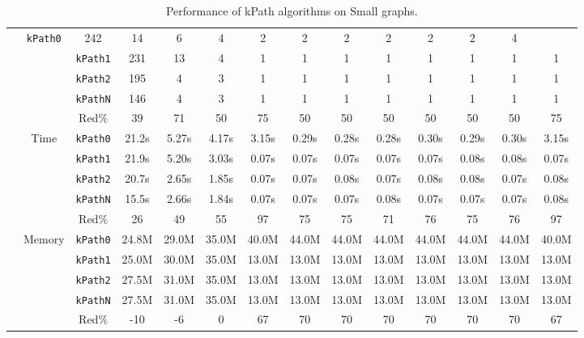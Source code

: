 \begin{table}[h!]
{\begin{tabular}{|l|c|c|c|c|c|c|c|c|c|c|c|c|c|}
& \texttt{kPath0} & 242 & 14 & 6 & 4 & 2 & 2 & 2 & 2 & 2 & 2 & 4 \\
& & \texttt{kPath1} & 231 & 13 & 4 & 1 & 1 & 1 & 1 & 1 & 1 & 1 & 1 \\
& & \texttt{kPath2} & 195 & 4 & 3 & 1 & 1 & 1 & 1 & 1 & 1 & 1 & 1 \\
& & \texttt{kPathN} & 146 & 4 & 3 & 1 & 1 & 1 & 1 & 1 & 1 & 1 & 1 \\
& & Red$\%$ & 39 & 71 & 50 & 75 & 50 & 50 & 50 & 50 & 50 & 50 & 75 \\
\cline{2-14} &
\multirow{5}{*}{Time}
& \texttt{kPath0} & 21.2s & 5.27s & 4.17s & 3.15s & 0.29s & 0.28s & 0.28s & 0.30s & 0.29s & 0.30s & 3.15s \\
& & \texttt{kPath1} & 21.9s & 5.20s & 3.03s & 0.07s & 0.07s & 0.07s & 0.07s & 0.07s & 0.08s & 0.08s & 0.07s \\
& & \texttt{kPath2} & 20.7s & 2.65s & 1.85s & 0.07s & 0.07s & 0.08s & 0.07s & 0.08s & 0.08s & 0.07s & 0.08s \\
& & \texttt{kPathN} & 15.5s & 2.66s & 1.84s & 0.07s & 0.07s & 0.07s & 0.08s & 0.07s & 0.07s & 0.07s & 0.08s \\
& & Red$\%$ & 26 & 49 & 55 & 97 & 75 & 75 & 71 & 76 & 75 & 76 & 97 \\
\cline{2-14} &
\multirow{5}{*}{Memory}
& \texttt{kPath0} & 24.8M & 29.0M & 35.0M & 40.0M & 44.0M & 44.0M & 44.0M & 44.0M & 44.0M & 44.0M & 40.0M \\
& & \texttt{kPath1} & 25.0M & 30.0M & 35.0M & 13.0M & 13.0M & 13.0M & 13.0M & 13.0M & 13.0M & 13.0M & 13.0M \\
& & \texttt{kPath2} & 27.5M & 31.0M & 35.0M & 13.0M & 13.0M & 13.0M & 13.0M & 13.0M & 13.0M & 13.0M & 13.0M \\
& & \texttt{kPathN} & 27.5M & 31.0M & 35.0M & 13.0M & 13.0M & 13.0M & 13.0M & 13.0M & 13.0M & 13.0M & 13.0M \\
& & Red$\%$ & -10 & -6 & 0 & 67 & 70 & 70 & 70 & 70 & 70 & 70 & 67 \\
\hline
\end{tabular}%
}
\caption{Performance of kPath algorithms on Small graphs.}
\label{tab:small_kpath}
\end{table}
